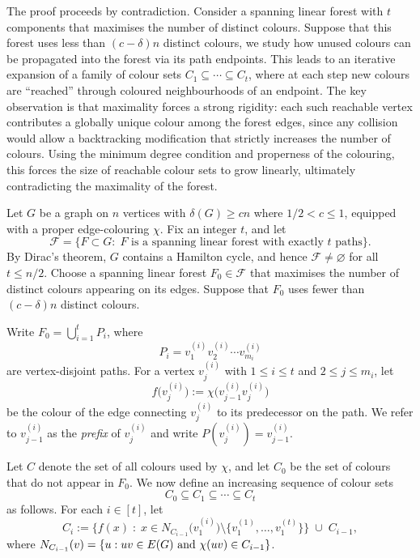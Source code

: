 \documentclass[11pt,reqno]{amsart}
\theoremstyle{definition}
\theoremstyle{remark}
\renewcommand\le{\leqslant}
\renewcommand\ge{\geqslant}
\begin{document}
The proof proceeds by contradiction. Consider a spanning linear forest with $t$ components that maximises the number of distinct colours. Suppose that this forest uses less than $(c-\delta)n$ distinct colours, we study how unused colours can be propagated into the forest via its path endpoints. This leads to an iterative expansion of a family of colour sets $C_1 \subseteq \cdots \subseteq C_t$, where at each step new colours are ``reached'' through coloured neighbourhoods of an endpoint. The key observation is that maximality forces a strong rigidity: each such reachable vertex contributes a globally unique colour among the forest edges, since any collision would allow a backtracking modification that strictly increases the number of colours. Using the minimum degree condition and properness of the colouring, this forces the size of reachable colour sets to grow linearly, ultimately contradicting the maximality of the forest.


Let $G$ be a graph on $n$ vertices with $\delta(G)\ge cn$ where $1/2<c\le 1$, equipped with a proper
edge-colouring $\chi$.
Fix an integer $t$, and let
\begin{equation*}%
\mathcal F=\big\{F\subset G:\; F \text{ is a spanning linear forest with exactly $t$ paths}\big\}.
\end{equation*}
By Dirac's theorem, $G$ contains a Hamilton cycle, and hence $\mathcal F\neq\varnothing$ for all $t\le n/2$. Choose a spanning linear forest $F_0\in\mathcal F$ that maximises the number of distinct colours appearing on its edges. Suppose that $F_0$ uses fewer than $(c-\delta)n$ distinct colours.

Write $F_0=\bigcup_{i=1}^t P_i$, where 
\[
P_i = v_1^{(i)}v_2^{(i)}\cdots v_{m_i}^{(i)}
\]
are vertex-disjoint paths. For a vertex $v_j^{(i)}$ with $1\le i\le t$ and $2\le j\le m_i$, let
\[
f\big(v_j^{(i)}\big) := \chi\big(v_{j-1}^{(i)}v_j^{(i)}\big)
\]
be the colour of the edge connecting $v_j^{(i)}$ to its predecessor on the path.
We refer to $v_{j-1}^{(i)}$ as the \emph{prefix} of $v_j^{(i)}$ and write
$P(v_j^{(i)})=v_{j-1}^{(i)}$.

Let $C$ denote the set of all colours used by $\chi$, and let $C_0$ be the set of colours that do not appear in $F_0$.
We now define an increasing sequence of colour sets
\[
C_0\subseteq C_1\subseteq \cdots \subseteq C_t
\]
as follows.
For each $i\in[t]$, let
\begin{equation}\label{eq:colourset}
C_i :=
\Big\{ f(x)\;:\;
x\in N_{C_{i-1}}\!\big(v_1^{(i)}\big)
      \setminus \{v_1^{(1)},\ldots,v_1^{(t)}\}
\Big\}
\;\cup\; C_{i-1},
\end{equation}
where $N_{C_{i-1}}(v)=\{u:uv\in E(G){\rm \ and}\ \chi(uv)\in C_{i-1}\}$.
\end{document}
